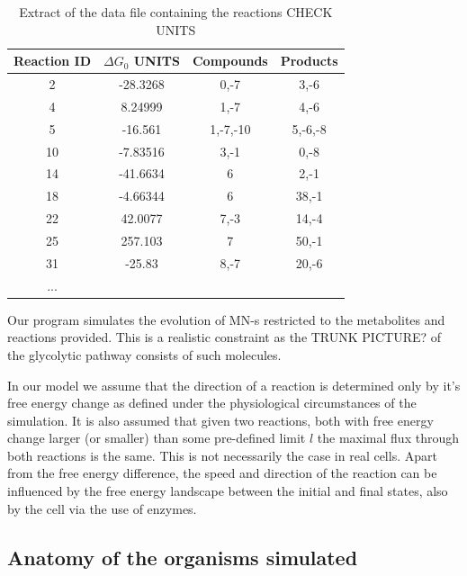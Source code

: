 \documentclass[a4paper,12pt]{article}
\begin{document}
	\begin{table}[htpb]
		\centering
		\begin{tabular}{cccc}
		Reaction ID &	$\Delta G_0$ UNITS & Compounds & Products \\ \hline
		2 &	-28.3268           & 0,-7      & 3,-6     \\
		4 &	8.24999            & 1,-7      & 4,-6     \\
		5 &	-16.561            & 1,-7,-10  & 5,-6,-8  \\
		10 &	-7.83516           & 3,-1      & 0,-8     \\
		14 &	-41.6634           & 6         & 2,-1     \\
		18 &	-4.66344           & 6         & 38,-1    \\
		22 &	42.0077            & 7,-3      & 14,-4    \\
		25 &	257.103            & 7         & 50,-1    \\
		31 &	-25.83             & 8,-7      & 20,-6    \\
		...&           &         
		\end{tabular}
		\caption{Extract of the data file containing the reactions CHECK UNITS}
		\label{tab:reacs}
	\end{table}
	
	Our program simulates the evolution of MN-s restricted to the metabolites and reactions provided. This is a realistic constraint as the TRUNK PICTURE? of the glycolytic pathway consists of such molecules.

	In our model we assume that the direction of a reaction is determined only by it's free energy change as defined under the physiological circumstances of the simulation. It is also assumed that given two reactions, both with free energy change larger (or smaller) than some pre-defined limit $l$ the maximal flux through both reactions is the same. This is not necessarily the case in real cells. Apart from the free energy difference, the speed and direction of the reaction can be influenced by the free energy landscape between the initial and final states, also by the cell via the use of enzymes. 


	\subsection{Anatomy of the organisms simulated}
	\label{ssub:anatomy_of_the_oganisms_simulated}
	
\end{document}

